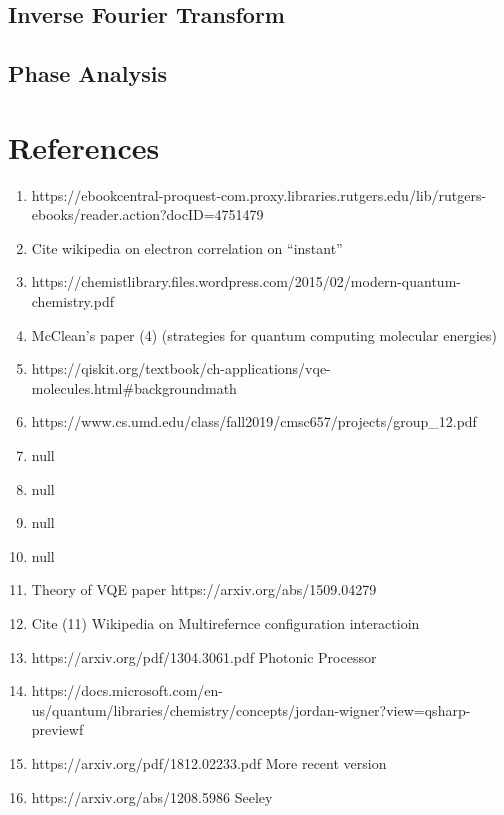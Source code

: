 \documentclass{article}
\begin{document}
  \subsection{Inverse Fourier Transform}
  \subsection{Phase Analysis}
\section{References}
\begin{enumerate}
  \item https://ebookcentral-proquest-com.proxy.libraries.rutgers.edu/lib/rutgers-ebooks/reader.action?docID=4751479
  \item Cite wikipedia on electron correlation on ``instant''
  \item https://chemistlibrary.files.wordpress.com/2015/02/modern-quantum-chemistry.pdf
  \item McClean's paper (4) (strategies for quantum computing molecular energies)
  \item https://qiskit.org/textbook/ch-applications/vqe-molecules.html#backgroundmath
  \item https://www.cs.umd.edu/class/fall2019/cmsc657/projects/group_12.pdf
  \item  null
  \item  null
  \item  null
  \item  null
  \item Theory of VQE paper https://arxiv.org/abs/1509.04279
  \item Cite (11) Wikipedia on Multirefernce configuration interactioin
  \item https://arxiv.org/pdf/1304.3061.pdf Photonic Processor
  \item https://docs.microsoft.com/en-us/quantum/libraries/chemistry/concepts/jordan-wigner?view=qsharp-previewf
  \item https://arxiv.org/pdf/1812.02233.pdf More recent version
  \item https://arxiv.org/abs/1208.5986 Seeley
\end{enumerate}
\end{document}
